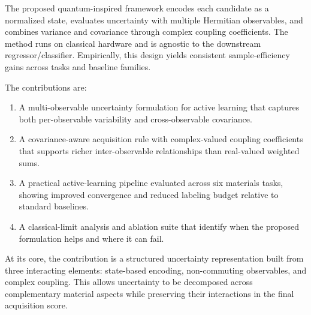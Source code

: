 \documentclass[conference]{IEEEtran}
\begin{document}
The proposed quantum-inspired framework encodes each candidate as a normalized state, evaluates uncertainty with multiple Hermitian observables, and combines variance and covariance through complex coupling coefficients. The method runs on classical hardware and is agnostic to the downstream regressor/classifier. Empirically, this design yields consistent sample-efficiency gains across tasks and baseline families.

The contributions are:
\begin{enumerate}
    \item A multi-observable uncertainty formulation for active learning that captures both per-observable variability and cross-observable covariance.
    \item A covariance-aware acquisition rule with complex-valued coupling coefficients that supports richer inter-observable relationships than real-valued weighted sums.
    \item A practical active-learning pipeline evaluated across six materials tasks, showing improved convergence and reduced labeling budget relative to standard baselines.
    \item A classical-limit analysis and ablation suite that identify when the proposed formulation helps and where it can fail.
\end{enumerate}

At its core, the contribution is a structured uncertainty representation built from three interacting elements: state-based encoding, non-commuting observables, and complex coupling. This allows uncertainty to be decomposed across complementary material aspects while preserving their interactions in the final acquisition score.

\begin{table}[!t]
\centering
\footnotesize
\caption{Positioning of the proposed method against representative alternatives.}
\label{tab:novelty_positioning}
\end{table}
\end{document}
